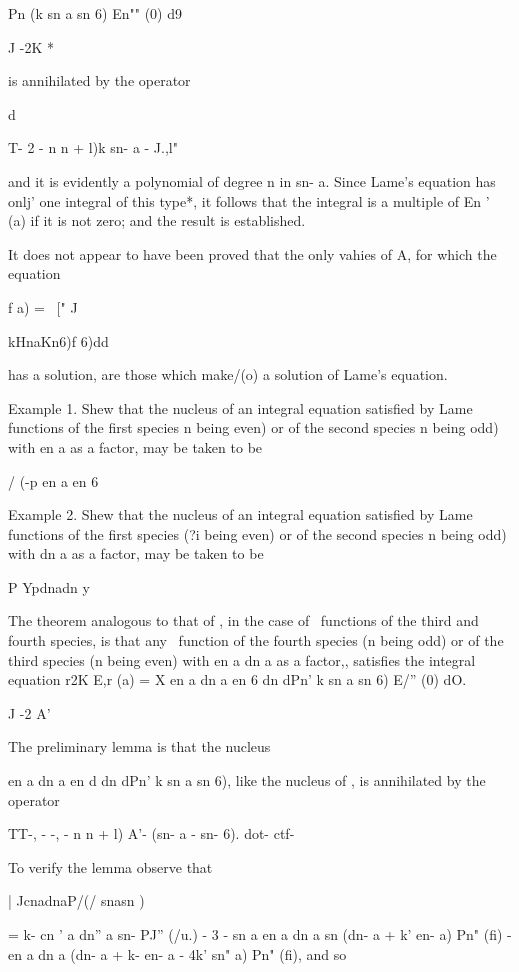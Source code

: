 {{{{{{{Pn (k sn a sn 6) En"" (0) d9

J -2K *

is annihilated by the operator

d

T- 2 - n n + l)k sn- a - J.,l"

%
%

and it is evidently a polynomial of degree n in sn- a. Since Lame's
equation has onlj' one integral of this type*, it follows that the
integral is a multiple of En ' (a) if it is not zero; and the result
is established.

It does not appear to have been proved that the only vahies of A, for
which the equation

f a) = \ [" J\ \ {kHnaKn6)f 6)dd

has a solution, are those which make/(o) a solution of Lame's
equation.

Example 1. Shew that the nucleus of an integral equation satisfied by
Lame functions of the first species n being even) or of the second
species n being odd) with en a as a factor, may be taken to be

/  (-p en a en 6

Example 2. Shew that the nucleus of an integral equation satisfied by
Lame functions of the first species (?i being even) or of the second
species n being odd) with dn a as a factor, may be taken to be

P Ypdnadn y


The theorem analogous to that of , in the case of \Lame\ functions
of the third and fourth species, is that any \Lame\ function of the
fourth species (n being odd) or of the third species (n being even)
with en a dn a as a factor,, satisfies the integral equation r2K E,r
(a) = X en a dn a en 6 dn dPn' k sn a sn 6) E/'' (0) dO.

J -2 A'

The preliminary lemma is that the nucleus

en a dn a en d dn dPn' k sn a sn 6), like the nucleus of , is
annihilated by the operator

TT-, - -, - n n + l) A'- (sn- a - sn- 6). dot- ctf-

To verify the lemma observe that

| JcnadnaP/(/ snasn )

= k- cn ' a dn'' a sn- PJ'' (/u.) - 3 - sn a en a dn a sn (dn- a + k'
en- a) Pn" (fi) - en a dn a (dn- a + k- en- a - 4k' sn" a) Pn" (fi),
and so

}}}}}}}}
